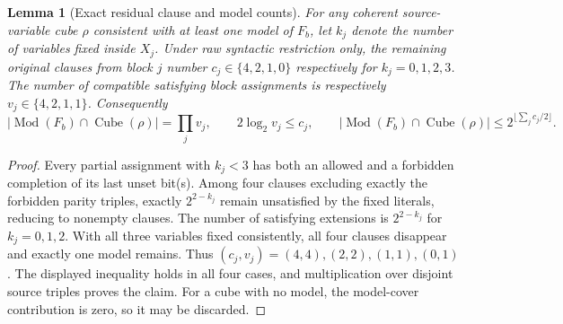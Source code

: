 \documentclass[11pt]{article}
\newtheorem{lemma}{Lemma}
\begin{document}
\begin{lemma}[Exact residual clause and model counts]
For any coherent source-variable cube $\rho$ consistent with at least one model of $F_b$, let $k_j$ denote the number of variables fixed inside $X_j$. Under \emph{raw syntactic restriction only}, the remaining original clauses from block $j$ number $c_j\in\{4,2,1,0\}$ respectively for $k_j=0,1,2,3$. The number of compatible satisfying block assignments is respectively $v_j\in\{4,2,1,1\}$. Consequently
\[
|\operatorname{Mod}(F_b)\cap \operatorname{Cube}(\rho)|
=\prod_jv_j,\qquad
2\log_2v_j\le c_j,\qquad
|\operatorname{Mod}(F_b)\cap\operatorname{Cube}(\rho)|\le2^{\lfloor\sum_jc_j/2\rfloor}.
\]
\end{lemma}
\begin{proof}
Every partial assignment with $k_j<3$ has both an allowed and a forbidden completion of its last unset bit(s). Among four clauses excluding exactly the forbidden parity triples, exactly $2^{2-k_j}$ remain unsatisfied by the fixed literals, reducing to nonempty clauses. The number of satisfying extensions is $2^{2-k_j}$ for $k_j=0,1,2$. With all three variables fixed consistently, all four clauses disappear and exactly one model remains. Thus $(c_j,v_j)=(4,4),(2,2),(1,1),(0,1)$. The displayed inequality holds in all four cases, and multiplication over disjoint source triples proves the claim. For a cube with no model, the model-cover contribution is zero, so it may be discarded.
\end{proof}
\end{document}
